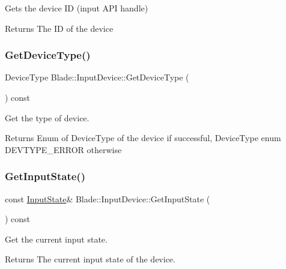Gets the device ID (input A\+PI handle) 

\begin{DoxyReturn}{Returns}
The ID of the device 
\end{DoxyReturn}
\mbox{\label{class_blade_1_1_input_device_a4af210da6267e595e1239bab35f8e9e3}} 
\subsubsection{\texorpdfstring{Get\+Device\+Type()}{GetDeviceType()}}
{\footnotesize\ttfamily Device\+Type Blade\+::\+Input\+Device\+::\+Get\+Device\+Type (\begin{DoxyParamCaption}{ }\end{DoxyParamCaption}) const\hspace{0.3cm}{\ttfamily [inline]}}



Get the type of device. 

\begin{DoxyReturn}{Returns}
Enum of Device\+Type of the device if successful, Device\+Type enum D\+E\+V\+T\+Y\+P\+E\+\_\+\+E\+R\+R\+OR otherwise 
\end{DoxyReturn}
\mbox{\label{class_blade_1_1_input_device_a0c652079b55274cf661ecf2657f65967}} 
\subsubsection{\texorpdfstring{Get\+Input\+State()}{GetInputState()}}
{\footnotesize\ttfamily const \hyperlink{struct_blade_1_1_input_state}{Input\+State}\& Blade\+::\+Input\+Device\+::\+Get\+Input\+State (\begin{DoxyParamCaption}{ }\end{DoxyParamCaption}) const\hspace{0.3cm}{\ttfamily [inline]}}



Get the current input state. 

\begin{DoxyReturn}{Returns}
The current input state of the device. 
\end{DoxyReturn}
\mbox{\label{class_blade_1_1_input_device_a45c90dad5932209601cf8eeea85f4036}} 
